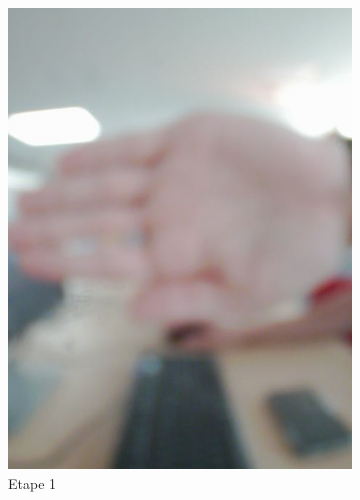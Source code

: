 \documentclass[a4paper,french]{article}
\begin{document}
\begin{figure}[!ht]
    \centering
    \begin{subfigure}{0.25\textwidth}
        \includegraphics[width=\textwidth]{figures/etape1.png}
        \caption{Etape 1}
        \label{subfig:etape1}
    \end{subfigure}
    \begin{subfigure}{0.25\textwidth}

\end{subfigure}
\end{figure}
\end{document}

